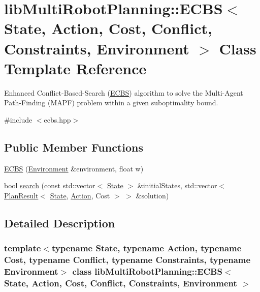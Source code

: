 \hypertarget{classlib_multi_robot_planning_1_1_e_c_b_s}{}\section{lib\+Multi\+Robot\+Planning\+:\+:E\+C\+BS$<$ State, Action, Cost, Conflict, Constraints, Environment $>$ Class Template Reference}
\label{classlib_multi_robot_planning_1_1_e_c_b_s}


Enhanced Conflict-\/\+Based-\/\+Search (\hyperlink{classlib_multi_robot_planning_1_1_e_c_b_s}{E\+C\+BS}) algorithm to solve the Multi-\/\+Agent Path-\/\+Finding (M\+A\+PF) problem within a given suboptimality bound.  




{\ttfamily \#include $<$ecbs.\+hpp$>$}

\subsection*{Public Member Functions}
\begin{DoxyCompactItemize}
\item 
\hyperlink{classlib_multi_robot_planning_1_1_e_c_b_s_acfa9763a8d2a9bbf76736343e266a419}{E\+C\+BS} (\hyperlink{classlib_multi_robot_planning_1_1_environment}{Environment} \&environment, float w)
\item 
bool \hyperlink{classlib_multi_robot_planning_1_1_e_c_b_s_afecd0fb22e9070ee79391a6850c15f3d}{search} (const std\+::vector$<$ \hyperlink{structlib_multi_robot_planning_1_1_state}{State} $>$ \&initial\+States, std\+::vector$<$ \hyperlink{structlib_multi_robot_planning_1_1_plan_result}{Plan\+Result}$<$ \hyperlink{structlib_multi_robot_planning_1_1_state}{State}, \hyperlink{namespacelib_multi_robot_planning_aba73fb71693f86a324adfa0e41e1053d}{Action}, Cost $>$ $>$ \&solution)
\end{DoxyCompactItemize}


\subsection{Detailed Description}
\subsubsection*{template$<$typename State, typename Action, typename Cost, typename Conflict, typename Constraints, typename Environment$>$\newline
class lib\+Multi\+Robot\+Planning\+::\+E\+C\+B\+S$<$ State, Action, Cost, Conflict, Constraints, Environment $>$}


